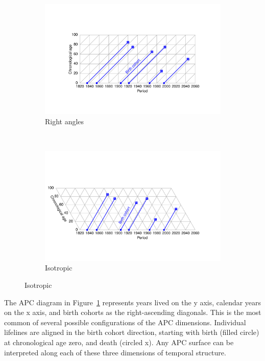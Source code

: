 \documentclass[11pt,oneside,a4paper]{article} %
\begin{document}
\begin{figure} 
\caption{An APC diagram in two projections.}
\label{fig:APC}
\centering
\begin{subfigure}{1.1\textwidth}
\caption{Right angles}
\vspace{-6em}
\label{fig:APCrt}
\includegraphics[scale=0.6]{Figures/APCrt.pdf}
\end{subfigure}
\\\vspace{-2em}
\begin{subfigure}{1.1\textwidth}
\caption{Isotropic}
\vspace{-6em}
\label{fig:APCeq}
\includegraphics[scale=0.6]{Figures/APCeq.pdf}
\end{subfigure}
\end{figure}

The APC diagram in Figure~\ref{fig:APCrt} represents years lived on the y axis,
calendar years on the x axis, and birth cohorts as the right-ascending
diagonals. This is the most common of several possible configurations
of the APC dimensions. Individual lifelines are aligned in the birth cohort
direction, starting with birth (filled circle) at chronological age zero, and death
(circled x). Any APC surface can be interpreted along each of these
three dimensions of temporal structure. 
\end{document}

